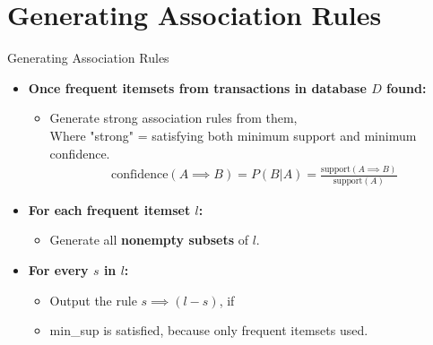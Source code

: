 \section{Generating Association Rules}

\begin{frame}{Generating Association Rules}
	\begin{itemize}
		\item \textbf{Once frequent itemsets from transactions in
			      database $D$ found:}
		      \begin{itemize}
			      \item Generate strong association rules from them,\\
			            Where "strong" = satisfying both minimum support and
			            minimum confidence.
			            \begin{align*}
				            \text{confidence}(A \implies B) = P(B|A) = \frac{\text{support}(A \implies B)}{\text{support}(A)}
			            \end{align*}
		      \end{itemize}
		\item \textbf{For each frequent itemset $l$:}
		      \begin{itemize}
			      \item Generate all \textbf{nonempty subsets} of $l$.
		      \end{itemize}
		\item \textbf{For every $s$ in $l$:}
		      \begin{itemize}
			      \item Output the rule $s \implies (l - s)$, if
			      \item min\_sup is satisfied, because only frequent itemsets
			            used.
		      \end{itemize}
	\end{itemize}
\end{frame}
